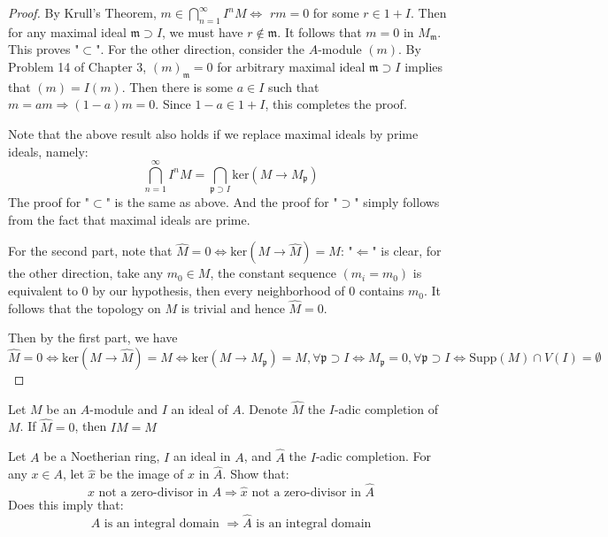 \documentclass{solution}
\begin{document}
\begin{proof}
    By Krull's Theorem, $m \in \bigcap\limits_{n = 1}^{\infty} I^n M \Leftrightarrow$ $rm = 0$ for some $r \in 1 + I$. Then for any maximal ideal $\mathfrak{m} \supset I$, we must have $r \notin \mathfrak{m}$. It follows that $m = 0$ in $M_{\mathfrak{m}}$. This proves "$\subset$". For the other direction, consider the $A$-module $(m)$. By Problem 14 of Chapter 3, $(m)_{\mathfrak{m}} = 0$ for arbitrary maximal ideal $\mathfrak{m} \supset I$ implies that $(m) = I(m)$. Then there is some $a \in I$ such that $m = am \Rightarrow (1 - a)m = 0$. Since $1 - a \in 1 + I$, this completes the proof.

    Note that the above result also holds if we replace maximal ideals by prime ideals, namely:
    $$\bigcap\limits_{n = 1}^{\infty} I^n M = \bigcap\limits_{\mathfrak{p} \supset I} \mathrm{ker}(M \rightarrow M_{\mathfrak{p}})$$
    The proof for "$\subset$" is the same as above. And the proof for "$\supset$" simply follows from the fact that maximal ideals are prime.

    For the second part, note that $\hat{M} = 0 \Leftrightarrow \mathrm{ker}(M \rightarrow \hat{M}) = M$: "$\Leftarrow$" is clear, for the other direction, take any $m_0 \in M$, the constant sequence $(m_i = m_0)$ is equivalent to $0$ by our hypothesis, then every neighborhood of $0$ contains $m_0$. It follows that the topology on $M$ is trivial and hence $\hat{M} = 0$.

    Then by the first part, we have $\hat{M} = 0 \Leftrightarrow \mathrm{ker}(M \rightarrow \hat{M}) = M \Leftrightarrow \mathrm{ker}(M \rightarrow M_{\mathfrak{p}}) = M, \forall \mathfrak{p} \supset I \Leftrightarrow M_\mathfrak{p} = 0, \forall \mathfrak{p} \supset I \Leftrightarrow \mathrm{Supp} (M) \cap V(I) = \emptyset$
\end{proof}

\begin{proposition}
    Let $M$ be an $A$-module and $I$ an ideal of $A$. Denote $\hat{M}$ the $I$-adic completion of $M$. If $\hat{M} = 0$, then $IM = M$
\end{proposition}

\begin{problem}
    Let $A$ be a Noetherian ring, $I$ an ideal in $A$, and $\hat{A}$ the $I$-adic completion. For any $x \in A$, let $\hat{x}$ be the image of $x$ in $\hat{A}$. Show that:
    $$x \text{ not a zero-divisor in $A$} \Rightarrow \hat{x} \text { not a zero-divisor in } \hat{A}$$
    Does this imply that:
    $$A \text{ is an integral domain } \Rightarrow \hat{A} \text{ is an integral domain}$$
\end{problem}
\end{document}
